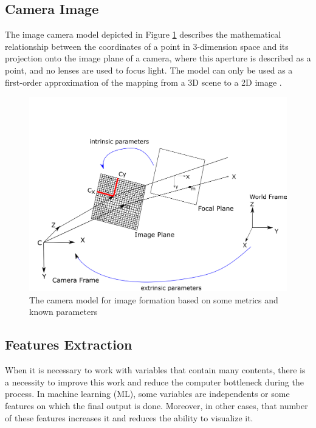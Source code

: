 \subsection{Camera Image}

The image camera model depicted in Figure \ref{fig:image_formation} describes the mathematical relationship between the coordinates of a point in 3-dimension space and its projection onto
the image plane of a camera, where this aperture is described as a point, and no lenses are used to focus light. The model can only be used as a first-order approximation of the mapping from a 3D scene to a 2D image \cite{forsyth2002computer}.




\begin{figure}[H]
\centering
\includegraphics[width=\textwidth]{imagens/image_formation.png}
\caption{The camera model for image formation based on some metrics and known parameters}
\label{fig:image_formation}
\end{figure}

\subsection{Features Extraction}

When it is necessary to work with variables that contain many contents, there is a necessity to improve this work and reduce the computer bottleneck during the process. In machine learning (ML), some variables are independents or some features on which the final output is done. Moreover, in other cases, that number of these features increases it and reduces the ability to visualize it. 

